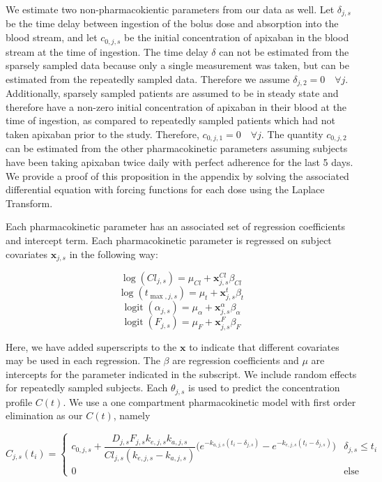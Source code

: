 We estimate two non-pharmacokientic parameters from our data as well.  Let $\delta_{j, s}$ be the time delay between ingestion of the bolus dose and absorption into the blood stream, and let $c_{0, j, s}$ be the initial concentration of apixaban in the blood stream at the time of ingestion.  The time delay $\delta$ can not be estimated from the sparsely sampled data because only a single measurement was taken, but can be estimated from the repeatedly sampled data.  Therefore we assume $\delta_{j, 2}=0 \quad \forall j$.  Additionally, sparsely sampled patients are assumed to be in steady state and therefore have a non-zero initial concentration of apixaban in their blood at the time of ingestion, as compared to repeatedly sampled patients which had not taken apixaban prior to the study.  Therefore, $c_{0, j, 1} = 0 \quad \forall j$.  The quantity $c_{0, j , 2}$ can be estimated from the other pharmacokinetic parameters assuming subjects have been taking apixaban twice daily with perfect adherence for the last 5 days.  We provide a proof of this proposition in the appendix by solving the associated differential equation with forcing functions for each dose using the Laplace Transform.

Each pharmacokinetic parameter has an associated set of regression coefficients and intercept term.  Each pharmacokinetic parameter is regressed on subject covariates $\mathbf{x}_{j, s}$ in the following way:

$$ \log(Cl_{j, s}) = \mu_{Cl} + \mathbf{x}_{j, s}^{Cl} \beta_{Cl} $$
$$ \log(t_{\max,j, s}) = \mu_{t} + \mathbf{x}_{j, s}^{t} \beta_{t} $$
$$ \operatorname{logit}(\alpha_{j, s}) = \mu_{\alpha} + \mathbf{x}_{j, s}^\alpha \beta_{\alpha} $$
$$ \operatorname{logit}(F_{j, s}) = \mu_{F} + \mathbf{x}_{j, s}^{F} \beta_{F} $$

Here, we have added superscripts to the $\mathbf{x}$ to indicate that different covariates may be used in each regression. The $\beta$ are regression coefficients and $\mu$ are intercepts for the parameter indicated in the subscript. We include random effects for repeatedly sampled subjects. Each $\theta_{j, s}$ is used to predict the concentration profile $C(t)$.  We use a one compartment pharmacokinetic model with first order elimination as our $C(t)$, namely

$$ C_{j, s}(t_i) =  \begin{cases} c_{0, j, s} + \dfrac{D_{j, s} F_{j, s} k_{e, j, s} k_{a, j, s}}{Cl_{j, s}(k_{e, j, s} - k_{a, j, s})} \Bigg( e^{-k_{a, j, s}(t_i - \delta_{j, s})} - e^{-k_{e, j, s}(t_i - \delta_{j, s})} \Bigg)  & \delta_{j, s} \leq t_i \\ 0 & \mbox{else} \end{cases}$$

